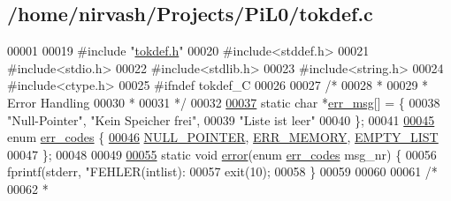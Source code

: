 \hypertarget{tokdef_8c_source}{\subsection{/home/nirvash/\-Projects/\-Pi\-L0/tokdef.c}
}

\begin{DoxyCode}
00001 
00019 \textcolor{preprocessor}{#include "\hyperlink{tokdef_8h}{tokdef.h}"}
00020 \textcolor{preprocessor}{#include<stddef.h>}
00021 \textcolor{preprocessor}{#include<stdio.h>}
00022 \textcolor{preprocessor}{#include<stdlib.h>}
00023 \textcolor{preprocessor}{#include<string.h>}
00024 \textcolor{preprocessor}{#include<ctype.h>}
00025 \textcolor{preprocessor}{#ifndef tokdef\_C}
00026 \textcolor{preprocessor}{}
00027 \textcolor{comment}{/*}
00028 \textcolor{comment}{ * }
00029 \textcolor{comment}{ * Error Handling}
00030 \textcolor{comment}{ * }
00031 \textcolor{comment}{*/}
00032 
\hypertarget{tokdef_8c_source_l00037}{}\hyperlink{tokdef_8c_ac904322e9cd774d033d702016491a991}{00037} \textcolor{keyword}{static} \textcolor{keywordtype}{char} *\hyperlink{tokdef_8c_ac904322e9cd774d033d702016491a991}{err_msg}[] = \{
00038     \textcolor{stringliteral}{"Null-Pointer"}, \textcolor{stringliteral}{"Kein Speicher frei"},
00039     \textcolor{stringliteral}{"Liste ist leer"}
00040   \}; 
00041   
\hypertarget{tokdef_8c_source_l00045}{}\hyperlink{tokdef_8c_ad7109e2dccd18353c3bdd5f55ad94b55}{00045} \textcolor{keyword}{enum} \hyperlink{tokdef_8c_ad7109e2dccd18353c3bdd5f55ad94b55}{err_codes} \{
\hypertarget{tokdef_8c_source_l00046}{}\hyperlink{tokdef_8c_ad7109e2dccd18353c3bdd5f55ad94b55a4fb873dc451927ef6a70af3a1e7f08bd}{00046}     \hyperlink{tokdef_8c_ad7109e2dccd18353c3bdd5f55ad94b55a4fb873dc451927ef6a70af3a1e7f08bd}{NULL_POINTER}, \hyperlink{tokdef_8c_ad7109e2dccd18353c3bdd5f55ad94b55afb88c5fa6e7d51074ec36bd4578e03a0}{ERR_MEMORY}, \hyperlink{tokdef_8c_ad7109e2dccd18353c3bdd5f55ad94b55a60202b752d64be3e9634f160ce5dca7d}{EMPTY_LIST}
00047   \};
00048   
00049 
\hypertarget{tokdef_8c_source_l00055}{}\hyperlink{tokdef_8c_a8b4b6428a8bf1450cf23b6032dec56cf}{00055} \textcolor{keyword}{static} \textcolor{keywordtype}{void} \hyperlink{tokdef_8c_a8b4b6428a8bf1450cf23b6032dec56cf}{error}(\textcolor{keyword}{enum} \hyperlink{tokdef_8c_ad7109e2dccd18353c3bdd5f55ad94b55}{err_codes} msg\_nr) \{
00056   fprintf(stderr, \textcolor{stringliteral}{"FEHLER(intlist): %
00057   exit(10);
00058 \}
00059 
00060 
00061 \textcolor{comment}{/*}
00062 \textcolor{comment}{ * }
}
\end{DoxyCode}
